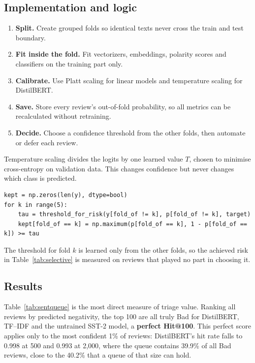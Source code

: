 \documentclass[11pt,a4paper]{article}
\newcommand{\T}[1]{}
\newcommand{\codefile}[3]{\par\vspace{0pt plus 3.5cm}\penalty-100\vspace{0pt plus -3.5cm}}
\begin{document}
\subsection{Implementation and logic}
\begin{enumerate}
\item \textbf{Split.} Create grouped folds so identical texts never cross the train and test boundary.
\item \textbf{Fit inside the fold.} Fit vectorizers, embeddings, polarity scores and classifiers on the training part only.
\item \textbf{Calibrate.} Use Platt scaling for linear models and temperature scaling for DistilBERT.
\item \textbf{Save.} Store every review's out-of-fold probability, so all metrics can be recalculated without retraining.
\item \textbf{Decide.} Choose a confidence threshold from the other folds, then automate or defer each review.
\end{enumerate}
\codefile{fit_temperature}{Temperature scaling}{sentiment.py}
Temperature scaling divides the logits by one learned value $T$, chosen to minimise cross-entropy on validation data. This changes confidence but never changes which class is predicted.
\codefile{threshold}{Choosing the threshold for a target risk}{metrics.py}
\begin{lstlisting}[caption={Cross-fitted deferral (\texttt{notebooks/02\_sentiment\_classification.ipynb})}]
kept = np.zeros(len(y), dtype=bool)
for k in range(5):
    tau = threshold_for_risk(y[fold_of != k], p[fold_of != k], target)
    kept[fold_of == k] = np.maximum(p[fold_of == k], 1 - p[fold_of == k]) >= tau
\end{lstlisting}
The threshold for fold $k$ is learned only from the other folds, so the achieved risk in Table~\ref{tab:selective} is measured on reviews that played no part in choosing it.

\subsection{Results}
\T{sent_scores}
\T{sent_extra}
\T{sent_confusion}
\T{sent_queue}
Table~\ref{tab:sentqueue} is the most direct measure of triage value. Ranking all reviews by predicted negativity, the top 100 are all truly Bad for DistilBERT, TF--IDF and the untrained SST-2 model, a \textbf{perfect Hit@100}. This perfect score applies only to the most confident 1\% of reviews: DistilBERT's hit rate falls to 0.998 at 500 and 0.993 at 2,000, where the queue contains 39.9\% of all Bad reviews, close to the 40.2\% that a queue of that size can hold.
\end{document}
